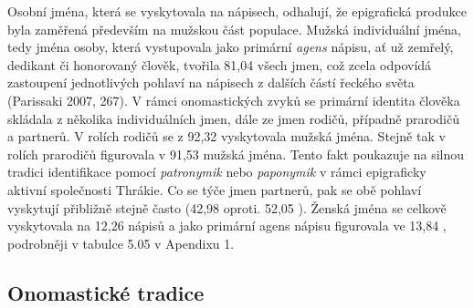 Osobní jména, která se vyskytovala na nápisech, odhalují, že epigrafická produkce byla zaměřená především na mužskou část populace. Mužská individuální jména, tedy jména osoby, která vystupovala jako primární {\em agens} nápisu, ať už zemřelý, dedikant či honorovaný člověk, tvořila 81,04  všech jmen, což zcela odpovídá zastoupení jednotlivých pohlaví na nápisech z dalších částí řeckého světa (Parissaki 2007, 267). V rámci onomastických zvyků se primární identita člověka skládala z několika individuálních jmen, dále ze jmen rodičů, případně prarodičů a partnerů. V rolích rodičů se z 92,32  vyskytovala mužská jména. Stejně tak v rolích prarodičů figurovala v 91,53  mužská jména. Tento fakt poukazuje na silnou tradici identifikace pomocí {\em patronymik} nebo {\em paponymik} v rámci epigraficky aktivní společnosti Thrákie. Co se týče jmen partnerů, pak se obě pohlaví vyskytují přibližně stejně často (42,98  oproti. 52,05 ). Ženská jména se celkově vyskytovala na 12,26  nápisů a jako primární agens nápisu figurovala ve 13,84 , podrobněji v tabulce 5.05 v Apendixu 1.

\subsection[onomastické-tradice]{Onomastické tradice}

